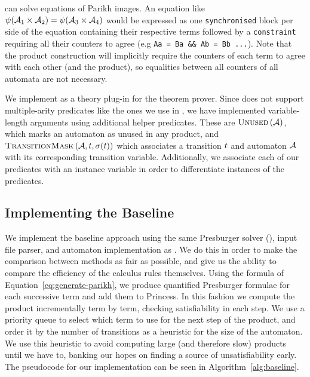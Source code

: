 \documentclass[acmsmall,review,anonymous,screen]{acmart}\settopmatter{printfolios=true,printccs=false,printacmref=true}
\theoremstyle{definition}
\begin{document}
\Catra{} can solve equations of Parikh images. An equation like
$\operatorname{\psi}(\mathcal{A}_1 \times \mathcal{A}_2) = \operatorname{\psi}(\mathcal{A}_3 \times
\mathcal{A}_4)$ would be expressed as one \lstinline{synchronised} block per side of
the equation containing their respective terms followed by a
\lstinline{constraint} requiring all their counters to agree (e.g
\lstinline|Aa = Ba && Ab = Bb ...|). Note that the product construction will implicitly require the counters of each term to agree with each other (and the product), so equalities between all counters of all automata are not necessary.

We implement \Calculus{} as a theory plug-in for the \Princess{} theorem prover.
Since \Princess{} does not support multiple-arity predicates like the ones we
use in \Calculus{}, we have implemented variable-length arguments using
additional helper predicates. These are $\operatorname{\textsc{Unused}}{}(\mathcal{A})$, which marks an
automaton as unused in any product, and $\operatorname{\textsc{TransitionMask}}{}(\mathcal{A},
t, \operatorname{\sigma}(t))$ which associates a transition $t$
and automaton $\mathcal{A}$ with its corresponding transition variable.
Additionally, we associate each of our predicates with an instance variable in
order to differentiate instances of the predicates.

\subsection{Implementing the Baseline}\label{sec:implementing-baseline}

We implement the baseline approach using the same Presburger solver
(\Princess{}), input file parser, and automaton implementation as \Catra. We
do this in order to make the comparison between methods as fair as possible, and
give us the ability to compare the efficiency of the calculus rules themselves.
Using the formula of Equation~\ref{eq:generate-parikh}, we produce quantified
Presburger formulae for each successive term and add them to Princess. In this
fashion we compute the product incrementally term by term, checking
satisfiability in each step. We use a priority queue to select which
term to use for the next step of the product, and order it by the number
of transitions as a heuristic for the size of the automaton. We use this heuristic
to avoid computing large (and therefore slow) products until we have to, banking
our hopes on finding a source of unsatisfiability early. The pseudocode for
our implementation can be seen in Algorithm~\ref{alg:baseline}.
\end{document}
